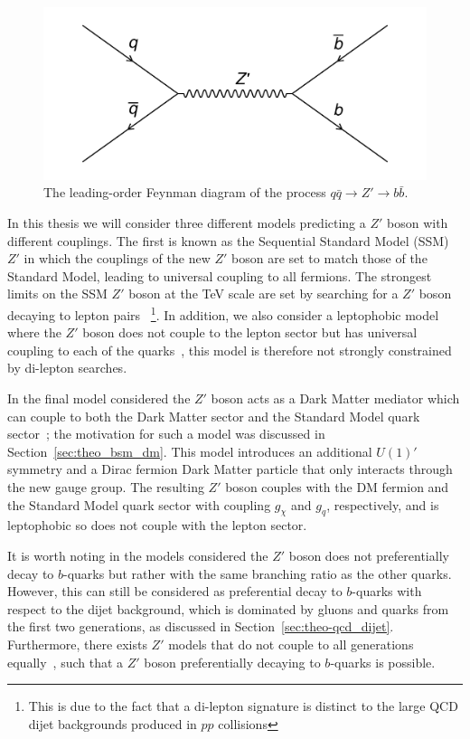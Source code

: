 \begin{figure}[!hbt]
  \begin{center}
    \includegraphics[width=0.7\linewidth, angle=0]{figs/Theory/bsm_zprime.png}
  \end{center}
  \caption{The leading-order Feynman diagram of the process $q\bar{q} \to Z' \to b\bar{b}$.}
  \label{fig:theo-bsm_zprime}
\end{figure}

In this thesis we will consider three different models predicting a $Z'$ boson with different couplings.
The first is known as the Sequential Standard Model (SSM) $Z'$ in which the couplings
of the new $Z'$ boson are set to match those of the Standard Model, leading to universal coupling to all fermions.
The strongest limits on the SSM $Z'$ boson at the TeV scale are set by searching for a $Z'$ boson decaying to lepton pairs~\cite{theo-bsm_dilep}
\footnote{This is due to the fact that a di-lepton signature is distinct to the large QCD dijet backgrounds produced in $pp$ collisions}.
In addition, we also consider a leptophobic model where the $Z'$ boson does not couple to the lepton sector
but has universal coupling to each of the quarks~\cite{theo-bsm_zprime_leptophobic},
this model is therefore not strongly constrained by di-lepton searches.

In the final model considered the $Z'$ boson acts as a Dark Matter mediator which can couple to both the Dark Matter sector and the Standard Model quark sector~\cite{theo_bsm-zprime_dm};
the motivation for such a model was discussed in Section~\ref{sec:theo_bsm_dm}.
This model introduces an additional $U(1)'$ symmetry and a Dirac fermion Dark Matter particle that only interacts through the new gauge group.
The resulting $Z'$ boson couples with the DM fermion and the Standard Model quark sector with coupling $g_\chi$\hspace{0.1mm} and $g_q$\hspace{0.1mm}, respectively,
and is leptophobic so does not couple with the lepton sector.

It is worth noting in the models considered the $Z'$ boson does not preferentially decay to $b$-quarks but rather with the same branching ratio as the other quarks.
However, this can still be considered as preferential decay to $b$-quarks with respect to the dijet background,
which is dominated by gluons and quarks from the first two generations, as discussed in Section~\ref{sec:theo-qcd_dijet}.
Furthermore, there exists $Z'$ models that do not couple to all generations equally~\cite{theo-bsm_zprime_3g},
such that a $Z'$ boson preferentially decaying to $b$-quarks is possible.

